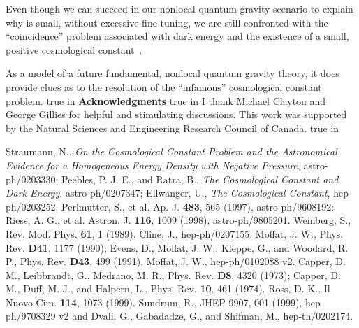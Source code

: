 \documentclass[a4paper,12pt]{article}
\begin{document}
Even though we can succeed in our nonlocal quantum gravity scenario to
explain why \coordHE{} is small, without excessive fine tuning, we
are still confronted with the ``coincidence'' problem associated with
dark energy and the existence of a small, positive cosmological
constant~\cite{Straumann}.

As a model of a future fundamental, nonlocal
quantum gravity theory, it does provide clues as to the resolution of the
``infamous'' cosmological constant problem.
 true in
{\bf Acknowledgments}
 true in
I thank Michael Clayton and George Gillies for helpful and
stimulating discussions. This work was supported by the Natural Sciences and
Engineering Research Council of Canada.   true in

\begin{thebibliography}{100}

 Straumann, N., {\it On the Cosmological Constant
Problem and the Astronomical Evidence for a Homogeneous Energy Density with
Negative Pressure}, astro-ph/0203330; Peebles, P. J. E., and Ratra, B.,
{\it The Cosmological Constant and Dark Energy}, astro-ph/0207347;
Ellwanger, U., {\it The Cosmological Constant}, hep-ph/0203252.
 Perlmutter, S., et al. Ap. J. {\bf 483}, 565 (1997),
astro-ph/9608192: Riess, A. G., et al. Astron. J. {\bf 116}, 1009 (1998),
astro-ph/9805201.
 Weinberg, S., Rev. Mod. Phys. {\bf
61}, 1 (1989).
 Cline, J., hep-ph/0207155.
 Moffat, J. W., Phys. Rev. {\bf D41}, 1177 (1990); Evens,
D., Moffat, J. W., Kleppe, G., and Woodard, R. P., Phys. Rev. {\bf D43},
499 (1991).
 Moffat, J. W., hep-ph/0102088 v2.
 Capper, D. M., Leibbrandt, G., Medrano, M. R., Phys.
Rev. {\bf D8}, 4320 (1973); Capper, D. M., Duff, M. J., and Halpern, L.,
Phys. Rev. {\bf 10}, 461 (1974).
 Ross, D. K., Il Nuovo
Cim. {\bf 114}, 1073 (1999).
 Sundrum, R., JHEP 9907, 001
(1999), hep-ph/9708329 v2 and Dvali, G., Gabadadze, G., and Shifman, M.,
hep-th/0202174.

\end{thebibliography}
\end{document}
